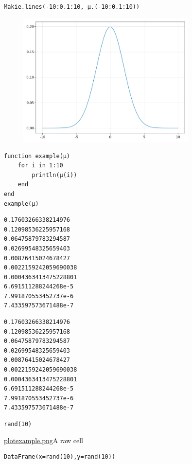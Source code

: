 \begin{lstlisting}[language=JuliaLocal, style=julia]
Makie.lines(-10:0.1:10, μ.(-10:0.1:10))
\end{lstlisting}

\begin{figure}[H]
	\centering
	\includegraphics[width=0.8\textwidth]{./figures/jupyternotebook_figure2.png}
	\label{fig:jupyternotebook_figure2.png}

\end{figure}

\begin{lstlisting}[language=JuliaLocal, style=julia]
function example(μ)
    for i in 1:10
        println(μ(i))
    end
end
example(μ)
\end{lstlisting}

\begin{verbatim}
0.17603266338214976
0.12098536225957168
0.06475879783294587
0.02699548325659403
0.00876415024678427
0.0022159242059690038
0.0004363413475228801
6.691511288244268e-5
7.991870553452737e-6
7.433597573671488e-7

\end{verbatim}

\begin{verbatim}
0.17603266338214976
0.12098536225957168
0.06475879783294587
0.02699548325659403
0.00876415024678427
0.0022159242059690038
0.0004363413475228801
6.691511288244268e-5
7.991870553452737e-6
7.433597573671488e-7

\end{verbatim}

\begin{lstlisting}[language=JuliaLocal, style=julia]
rand(10)
\end{lstlisting}
\href{Figure2}{plotexample.png}A raw cell
\begin{lstlisting}[language=JuliaLocal, style=julia]
DataFrame(x=rand(10),y=rand(10))
\end{lstlisting}

